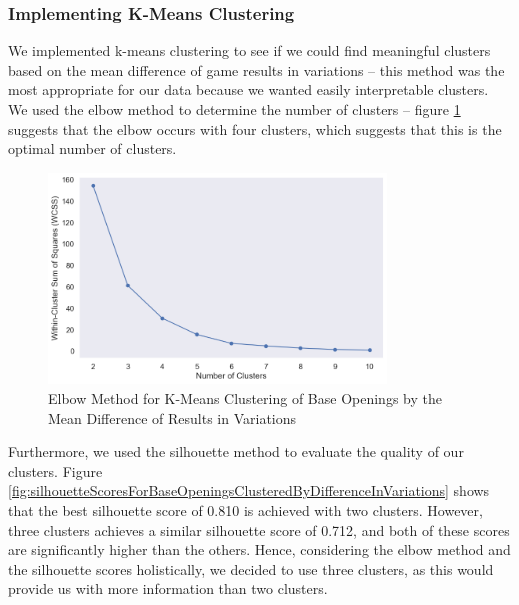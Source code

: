 \documentclass[a4paper, 11pt]{article}
\begin{document}
\newpage
\subsubsection{Implementing K-Means Clustering}
We implemented k-means clustering to see if we could find meaningful clusters based on the mean difference of game results in variations -- this method was the most appropriate for our data because we wanted easily interpretable clusters. We used the elbow method to determine the number of clusters -- figure \ref{fig:elbowMethodForBaseOpeningsClusteredByDifferenceInVariations} suggests that the elbow occurs with four clusters, which suggests that this is the optimal number of clusters.

\begin{figure}[H]
    \centering
    \caption{Elbow Method for K-Means Clustering of Base Openings by the Mean Difference of Results in Variations}
    \label{fig:elbowMethodForBaseOpeningsClusteredByDifferenceInVariations}
    \includegraphics[width=0.8\textwidth]{Elbow Method for Clustering of Base Opening by Difference in Variations.png}
\end{figure}

Furthermore, we used the silhouette method to evaluate the quality of our clusters. Figure \ref{fig:silhouetteScoresForBaseOpeningsClusteredByDifferenceInVariations} shows that the best silhouette score of 0.810 is achieved with two clusters. However, three clusters achieves a similar silhouette score of 0.712, and both of these scores are significantly higher than the others. Hence, considering the elbow method and the silhouette scores holistically, we decided to use three clusters, as this would provide us with more information than two clusters.
\end{document}
